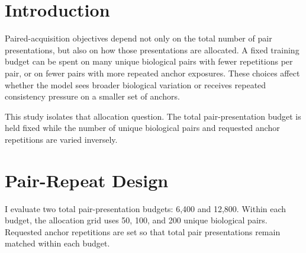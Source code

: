 ﻿\documentclass[10pt]{article}
\begin{document}
\vspace{0.28in}

\section{Introduction}

Paired-acquisition objectives depend not only on the total number of pair presentations, but also on how those presentations are allocated. A fixed training budget can be spent on many unique biological pairs with fewer repetitions per pair, or on fewer pairs with more repeated anchor exposures. These choices affect whether the model sees broader biological variation or receives repeated consistency pressure on a smaller set of anchors.

This study isolates that allocation question. The total pair-presentation budget is held fixed while the number of unique biological pairs and requested anchor repetitions are varied inversely.

\section{Pair-Repeat Design}

I evaluate two total pair-presentation budgets: 6,400 and 12,800. Within each budget, the allocation grid uses 50, 100, and 200 unique biological pairs. Requested anchor repetitions are set so that total pair presentations remain matched within each budget.

\begin{center}
\begin{minipage}{0.98\linewidth}
\centering
{}
\label{tab:allocation-means}
\footnotesize
{}
\end{minipage}
\end{center}
\end{document}
